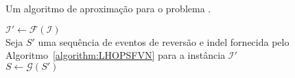 \begin{algorithm}[!tbh]
  \caption{Um algoritmo de aproximação para o problema \SbIRI{}.\label{algorithm:QKCVERGO}}
  $\mathcal{I'} \gets \mathcal{F}(\mathcal{I})$ \\
  Seja $S'$ uma sequência de eventos de reversão e indel fornecida pelo Algoritmo~\ref{algorithm:LHOPSFVN} para a instância $\mathcal{I'}$ \\
  $S\gets \mathcal{G}(S')$ \\
\end{algorithm}